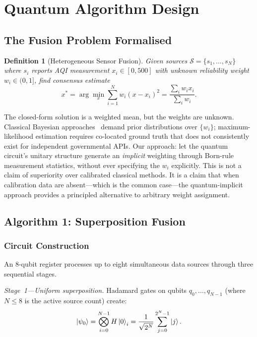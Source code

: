 \documentclass[conference]{IEEEtran}
\newtheorem{definition}{Definition}
\begin{document}
\section{Quantum Algorithm Design}\label{sec:quantum}

\subsection{The Fusion Problem Formalised}

\begin{definition}[Heterogeneous Sensor Fusion]\label{def:hsf}
Given sources $\mathcal{S} = \{s_1, \ldots, s_N\}$ where $s_i$ reports
AQI measurement $x_i \in [0,500]$ with unknown reliability weight
$w_i \in (0,1]$, find consensus estimate
\begin{equation}\label{eq:obj}
x^* = \arg\min_x \sum_{i=1}^N w_i(x - x_i)^2 =
      \frac{\sum_i w_i x_i}{\sum_i w_i}.
\end{equation}
\end{definition}

The closed-form solution is a weighted mean, but the weights are unknown.
Classical Bayesian approaches~\cite{li2011review} demand prior distributions
over $\{w_i\}$; maximum-likelihood estimation requires co-located ground
truth that does not consistently exist for independent governmental APIs.
Our approach: let the quantum circuit's unitary structure generate an
\emph{implicit} weighting through Born-rule measurement statistics, without
ever specifying the $w_i$ explicitly.
This is not a claim of superiority over calibrated classical methods.
It is a claim that when calibration data are absent---which is the
common case---the quantum-implicit approach provides a principled
alternative to arbitrary weight assignment.

\subsection{Algorithm 1: Superposition Fusion}\label{subsec:superfusion}

\subsubsection{Circuit Construction}

An 8-qubit register processes up to eight simultaneous data sources
through three sequential stages.

\textit{Stage~1---Uniform superposition.}
Hadamard gates on qubits $q_0, \ldots, q_{N-1}$ (where $N \leq 8$ is
the active source count) create:
\begin{equation}\label{eq:init}
\ket{\psi_0} = \bigotimes_{i=0}^{N-1} H\ket{0}_i =
\frac{1}{\sqrt{2^N}} \sum_{j=0}^{2^N-1}\ket{j}.
\end{equation}
\end{document}
